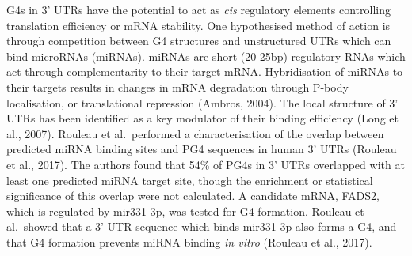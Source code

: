 \documentclass[12pt,a4paper,]{report}
\begin{document}
G4s in 3' UTRs have the potential to act as \emph{cis} regulatory
elements controlling translation efficiency or mRNA stability. One
hypothesised method of action is through competition between G4
structures and unstructured UTRs which can bind microRNAs (miRNAs).
miRNAs are short (20-25bp) regulatory RNAs which act through
complementarity to their target mRNA. Hybridisation of miRNAs to their
targets results in changes in mRNA degradation through P-body
localisation, or translational repression (Ambros, 2004). The local
structure of 3' UTRs has been identified as a key modulator of their
binding efficiency (Long et al., 2007). Rouleau et al.~performed a
characterisation of the overlap between predicted miRNA binding sites
and PG4 sequences in human 3' UTRs (Rouleau et al., 2017). The authors
found that 54\% of PG4s in 3' UTRs overlapped with at least one
predicted miRNA target site, though the enrichment or statistical
significance of this overlap were not calculated. A candidate mRNA,
FADS2, which is regulated by mir331-3p, was tested for G4 formation.
Rouleau et al.~showed that a 3' UTR sequence which binds mir331-3p also
forms a G4, and that G4 formation prevents miRNA binding \emph{in vitro}
(Rouleau et al., 2017).

\newpage
\end{document}
